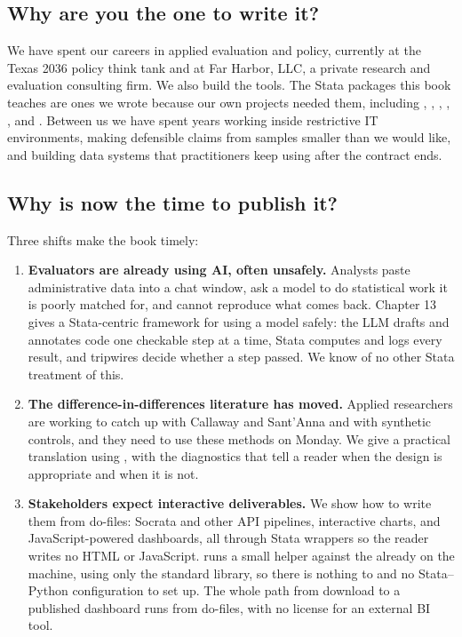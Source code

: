 \documentclass[11pt]{article}
\begin{document}
\subsection*{Why are you the one to write it?}
We have spent our careers in applied evaluation and policy, currently at the Texas 2036 policy think tank and at Far Harbor, LLC, a private research and evaluation consulting firm. We also build the tools. The Stata packages this book teaches are ones we wrote because our own projects needed them, including , , , , , and . Between us we have spent years working inside restrictive IT environments, making defensible claims from samples smaller than we would like, and building data systems that practitioners keep using after the contract ends.

\subsection*{Why is now the time to publish it?}
Three shifts make the book timely:
\begin{enumerate}
    \item \textbf{Evaluators are already using AI, often unsafely.} Analysts paste administrative data into a chat window, ask a model to do statistical work it is poorly matched for, and cannot reproduce what comes back. Chapter 13 gives a Stata-centric framework for using a model safely: the LLM drafts and annotates code one checkable step at a time, Stata computes and logs every result, and  tripwires decide whether a step passed. We know of no other Stata treatment of this.
    \item \textbf{The difference-in-differences literature has moved.} Applied researchers are working to catch up with Callaway and Sant'Anna and with synthetic controls, and they need to use these methods on Monday. We give a practical translation using , with the diagnostics that tell a reader when the design is appropriate and when it is not.
    \item \textbf{Stakeholders expect interactive deliverables.} We show how to write them from do-files: Socrata and other API pipelines, interactive charts, and JavaScript-powered dashboards, all through Stata wrappers so the reader writes no HTML or JavaScript.  runs a small helper against the  already on the machine, using only the standard library, so there is nothing to  and no Stata--Python configuration to set up. The whole path from download to a published dashboard runs from do-files, with no license for an external BI tool.
\end{enumerate}
\end{document}
